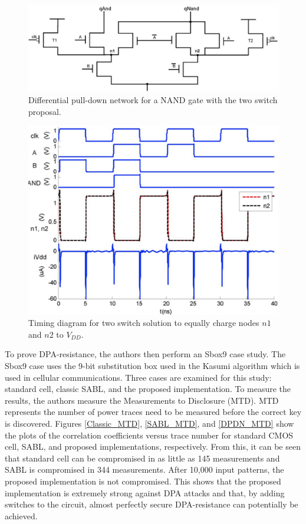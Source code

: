 \documentclass[conference, 12pt]{IEEEtran}
\newcommand{\x}{1}						%
\begin{document}
			\begin{figure}[tbp]
				\centering
				\includegraphics[width=\x\linewidth]{ReportFiles/DPDN_NAND_2Switch.png}
				\caption{Differential pull-down network for a NAND gate with the two switch proposal.\cite{b5}}
				\label{DPDN_NAND_2Switch}
			\end{figure}
			\begin{figure}[tbp]
				\centering
				\includegraphics[width=\x\linewidth]{ReportFiles/DPDN_Two_Switch_Timing.png}
				\caption{Timing diagram for two switch solution to equally charge nodes $n1$ and $n2$ to $V_{DD}$.\cite{b5}}
				\label{DPDN_Two_Switch_Timing}
			\end{figure}

			To prove DPA-resistance, the authors then perform an Sbox9 case study. The Sbox9 case uses the 9-bit substitution box used in the Kasumi algorithm which is used in cellular communications. Three cases are examined for this study: standard cell, classic SABL, and the proposed implementation. To measure the results, the authors measure the Measurements to Disclosure (MTD). MTD represents the number of power traces need to be measured before the correct key is discovered. Figures \ref{Classic_MTD}, \ref{SABL_MTD}, and \ref{DPDN_MTD} show the plots of the correlation coefficients versus trace number for standard CMOS cell, SABL, and proposed implementations, respectively. From this, it can be seen that standard cell can be compromised in as little as 145 measurements and SABL is compromised in 344 measurements. After 10,000 input patterns, the proposed implementation is not compromised. This shows that the proposed implementation is extremely strong against DPA attacks and that, by adding switches to the circuit, almost perfectly secure DPA-resistance can potentially be achieved.
\end{document}
